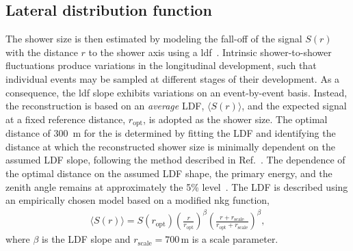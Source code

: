\documentclass[main.tex]{subfiles}
\begin{document}
\subsection{Lateral distribution function}
\label{subsec:ldf}

The shower size is then estimated by modeling the fall-off of the signal $S(r)$ with the distance $r$ to the shower axis using a \gls{ldf}~\cite{Silli:2021:PerformanceSD433}.
Intrinsic shower-to-shower fluctuations produce variations in the longitudinal development, such that individual events may be sampled at different stages of their development.
As a consequence, the \gls{ldf} slope exhibits variations on an event-by-event basis. 
Instead, the reconstruction is based on an \textit{average} LDF, $\langle S(r)\rangle$, and the expected signal at a fixed reference distance, $r_\text{opt}$, is adopted as the shower size.
The optimal distance of \qty{300}{m} for the  is determined by fitting the LDF and identifying the distance at which the reconstructed shower size is minimally dependent on the assumed LDF slope, following the method described in Ref.~\cite{Newton:2007:OptimalDistance}.
The dependence of the optimal distance on the assumed LDF shape, the primary energy, and the zenith angle remains at approximately the 5\% level~\cite{PierreAuger:2020:SDReconstruction}.
The LDF is described using an empirically chosen model based on a modified \gls{nkg} function,
\begin{align}
  \langle S(r)\rangle =
    S(r_\text{opt})
    \left(\frac{r}{r_\text{opt}}\right)^\beta
    \left(\frac{r + r_\text{scale}}{r_\text{opt} + r_\text{scale}}\right)^\beta,
\end{align}
%
\noindent where $\beta$ is the LDF slope and $r_\text{scale}=700\,\text{m}$ is a scale parameter.
\end{document}
